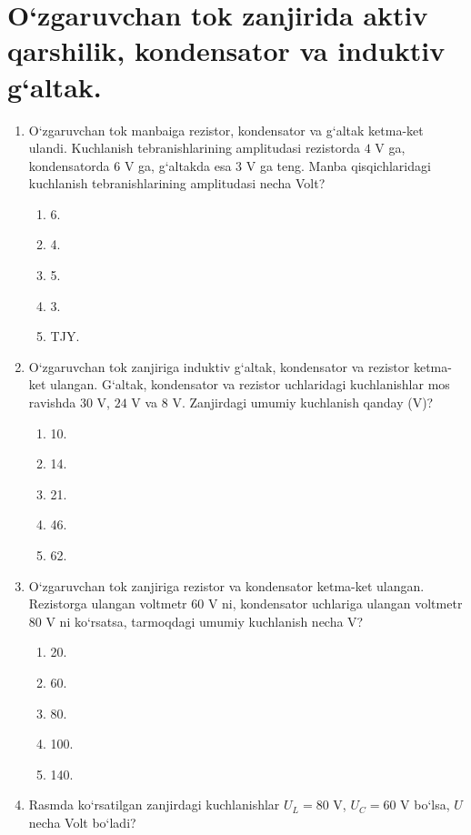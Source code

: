 \section{O‘zgaruvchan tok zanjirida aktiv  qarshilik, kondensator va induktiv g‘altak. }


\begin{enumerate}

\item O‘zgaruvchan tok manbaiga rezistor, kondensator va g‘altak ketma-ket ulandi. Kuchlanish tebranishlarining amplitudasi rezistorda $4$ V ga, kondensatorda $6$ V ga, g‘altakda esa $3$ V ga teng. Manba qisqichlaridagi kuchlanish tebranishlarining amplitudasi necha Volt?
\begin{enumerate}[label=\Alph*)]
\item 6.
\item 4.
\item 5.
\item 3.
\item TJY.
\end{enumerate}

\item O‘zgaruvchan tok zanjiriga induktiv g‘altak, kondensator va rezistor ketma-ket ulangan. G‘altak, kondensator va rezistor uchlaridagi kuchlanishlar mos ravishda $30$ V, $24$ V va $8$ V. Zanjirdagi umumiy kuchlanish qanday (V)?
\begin{enumerate}[label=\Alph*)]
\item 10.
\item 14.
\item 21.
\item 46.
\item 62.
\end{enumerate}

\item O‘zgaruvchan tok zanjiriga rezistor va kondensator ketma-ket ulangan. Rezistorga ulangan voltmetr $60$ V ni, kondensator uchlariga ulangan voltmetr $80$ V ni ko‘rsatsa, tarmoqdagi umumiy kuchlanish necha V?
\begin{enumerate}[label=\Alph*)]
\item 20.
\item 60.
\item 80.
\item 100.
\item 140.
\end{enumerate}

\item Rasmda ko‘rsatilgan zanjirdagi kuchlanishlar $U_L=80$ V, $U_C=60$ V bo‘lsa, $U$ necha Volt bo‘ladi?


\end{enumerate}
